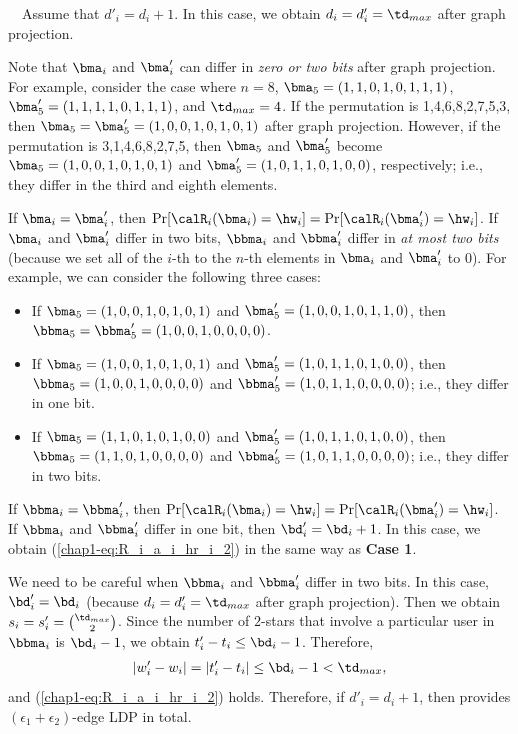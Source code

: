 \smallskip
{}~~Assume that $d'_i = d_i + 1$. 
In this case, we obtain $d_i = d'_i = \td_{max}$ after graph projection. 

Note that $\bma_i$ and $\bma'_i$ can differ in \textit{zero or two bits} after graph projection. 
For example, consider the case where $n=8$, $\bma_5=(1,1,0,1,0,1,1,1)$, $\bma'_5=(1,1,1,1,0,1,1,1)$, and $\td_{max}=4$. 
If the permutation is 1,4,6,8,2,7,5,3, then $\bma_5=\bma'_5=(1,0,0,1,0,1,0,1)$ after graph projection. 
However, if the permutation is 3,1,4,6,8,2,7,5, then $\bma_5$ and $\bma'_5$ become $\bma_5=(1,0,0,1,0,1,0,1)$ and $\bma'_5=(1,0,1,1,0,1,0,0)$, respectively; i.e., they differ in the third and eighth elements. 

If $\bma_i=\bma'_i$, then $\Pr[\calR_i(\bma_i) = \hw_i] = \Pr[\calR_i(\bma'_i) = \hw_i]$. 
If $\bma_i$ and $\bma'_i$ differ in two bits, $\bbma_i$ and $\bbma'_i$ differ in \textit{at most two bits} (because we set all of the $i$-th to the $n$-th elements in $\bma_i$ and $\bma'_i$ to $0$). 
For example, we can consider the following three cases:
\begin{itemize}
    \item If $\bma_5=(1,0,0,1,0,1,0,1)$ and $\bma'_5=(1,0,0,1,0,1,1,0)$, then $\bbma_5=\bbma'_5=(1,0,0,1,0,0,0,0)$. 
    \item If $\bma_5=(1,0,0,1,0,1,0,1)$ and $\bma'_5=(1,0,1,1,0,1,0,0)$, then $\bbma_5=(1,0,0,1,0,0,0,0)$ and $\bbma'_5=(1,0,1,1, 0,0,\allowbreak0,0)$; i.e., they differ in one bit. 
    \item If $\bma_5=(1,1,0,1,0,1,0,0)$ and $\bma'_5=(1,0,1,1,0,1,0,0)$, then $\bbma_5=(1,1,0,1,0,0,0,0)$ and $\bbma'_5=(1,0,1,1,0,0,\allowbreak0,0)$; i.e., they differ in two bits.
\end{itemize}
If $\bbma_i=\bbma'_i$, then $\Pr[\calR_i(\bma_i) = \hw_i] = \Pr[\calR_i(\bma'_i) = \hw_i]$. 
If $\bbma_i$ and $\bbma'_i$ differ in one bit, then $\bd'_i = \bd_i + 1$. 
In this case, we obtain (\ref{chap1-eq:R_i_a_i_hr_i_2}) in the same way as \textbf{Case 1}. 

We need to be careful when $\bbma_i$ and $\bbma'_i$ differ in two bits. 
In this case, $\bd'_i = \bd_i$ (because $d_i = d'_i = \td_{max}$ after graph projection). 
Then we obtain $s_i = s'_i = \binom{\td_{max}}{2}$. 
Since the number of $2$-stars that involve a particular user in $\bbma_i$ is $\bd_i - 1$, we obtain $t'_i - t_i \leq \bd_i - 1$. Therefore,
\begin{align*}
|w'_i - w_i| = |t'_i - t_i| \leq \bd_i - 1 < \td_{max},
\end{align*}
and (\ref{chap1-eq:R_i_a_i_hr_i_2}) holds. 
Therefore, if $d'_i = d_i + 1$, then 
 provides $(\epsilon_1 + \epsilon_2)$-edge LDP in total. 

